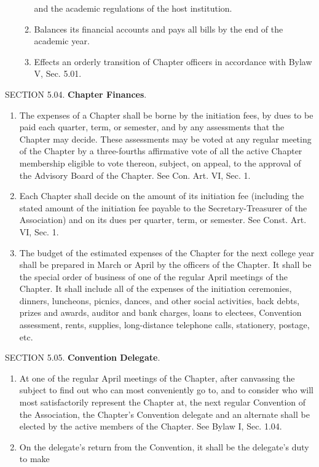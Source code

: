 \begin{optionalpart}
\begin{enumerate}
\begin{enumerate}
and the academic regulations of the host institution. 
\item Balances its financial accounts and 
pays all bills by the end of the academic year. 
\item  Effects an orderly transition of Chapter 
officers in accordance with Bylaw V, Sec. 5.01. 
\end{enumerate}
\end{enumerate}
SECTION 5.04. {\bf Chapter Finances}.
\begin{enumerate}
\item The expenses of a Chapter shall be borne by the 
initiation fees, by dues to be paid each quarter, term, or semester, and by any assessments that the 
Chapter may decide. These assessments may be voted at any regular meeting of the Chapter by a 
three-fourths affirmative vote of all the active Chapter membership eligible to vote thereon, subject, 
on appeal, to the approval of the Advisory Board of the Chapter. See Con. Art. VI, Sec. 1.
\item Each Chapter shall decide on the amount of its initiation fee (including the stated 
amount of the initiation fee payable to the Secretary-Treasurer of the Association) and on 
its dues per quarter, term, or semester. See Const. Art. VI, Sec. 1.
\item The budget of the estimated expenses of the Chapter for the next college year shall 
be prepared in March or April by the officers of the Chapter. It shall be the special order 
of business of one of the regular April meetings of the Chapter. It shall include all of the 
expenses of the initiation ceremonies, dinners, luncheons, picnics, dances, and other social 
activities, back debts, prizes and awards, auditor and bank charges, loans to electees, Convention assessment, rents, supplies, long-distance telephone calls, stationery, postage, etc.
\end{enumerate}
SECTION 5.05. {\bf Convention Delegate}.
\begin{enumerate}
\item At one of the regular April meetings of the 
Chapter, after canvassing the subject to find out who can most conveniently go to, and to 
consider who will most satisfactorily represent the Chapter at, the next regular Convention 
of the Association, the Chapter's Convention delegate and an alternate shall be elected by 
the active members of the Chapter. See Bylaw I, Sec. 1.04.
\item On the delegate's return from the Convention, it shall be the delegate's duty to make 

\end{enumerate}
\end{optionalpart}
